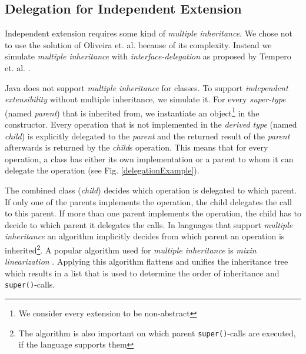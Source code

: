 \documentclass{report}
\begin{document}

\subsection{Delegation for Independent Extension}

\label{backgroundVisibility}

Independent extension requires some kind of \emph{multiple inheritance}. We chose not to use the solution of Oliveira et. al. because of its complexity. Instead we simulate \emph{multiple inheritance} with \emph{interface-delegation} as proposed by Tempero et. al. \cite{Tempero-Multiple-2000}.

Java does not support \emph{multiple inheritance} for classes. To support \emph{independent extensibility} without multiple inheritance, we simulate it. For every \emph{super-type} (named \emph{parent}) that is inherited from, we instantiate an object\footnote{We consider every extension to be non-abstract} in the constructor. Every operation that is not implemented in the \emph{derived type} (named \emph{child}) is explicitly delegated to the \emph{parent} and the returned result of the \emph{parent} afterwards is returned by the \emph{child}s operation. This means that for every operation, a class has either its own implementation or a parent to whom it can delegate the operation (see Fig. \ref{delegationExample}).

The combined class (\emph{child}) decides which operation is delegated to which parent. If only one of the parents implements the operation, the child delegates the call to this parent. If more than one parent implements the operation, the child has to decide to which parent it delegates the calls. In languages that support \emph{multiple inheritance} an algorithm implicitly decides from which parent an operation is inherited\footnote{The algorithm is also important on which parent \lstinline{super()}-calls are executed, if the language supports them}. A popular algorithm used for \emph{multiple inheritance} is \emph{mixin linearization} \cite{Bracha-Mixin-1990}. Applying this algorithm flattens and unifies the inheritance tree which results in a list that is used to determine the order of inheritance and \lstinline{super()}-calls.
\end{document}
